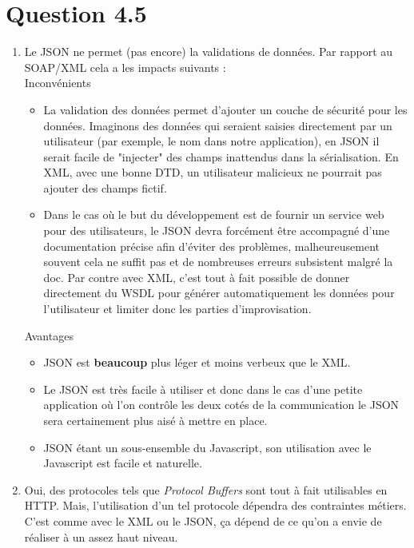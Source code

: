 \documentclass[12pt]{article}
\begin{document}
\section*{Question 4.5}

\begin{enumerate}[leftmargin=*, label=\alph*)]
\item Le JSON ne permet (pas encore) la validations de données. Par rapport au SOAP/XML cela a les impacts suivants : \\

\textcolor{pred}{Inconvénients}

\begin{itemize}
\item La validation des données permet d'ajouter un couche de sécurité pour les données. Imaginons des données qui seraient saisies directement par un utilisateur (par exemple, le nom dans notre application), en JSON il serait facile de "injecter" des champs inattendus dans la sérialisation. En XML, avec une bonne DTD, un utilisateur malicieux ne pourrait pas ajouter des champs fictif.

\item Dans le cas où le but du développement est de fournir un service web pour des utilisateurs, le JSON devra forcément être accompagné d'une documentation précise afin d'éviter des problèmes, malheureusement souvent cela ne suffit pas et de nombreuses erreurs subsistent malgré la doc. Par contre avec XML, c'est tout à fait possible de donner directement du WSDL pour générer automatiquement les données pour l'utilisateur et limiter donc les parties d'improvisation. \\
\end{itemize}

\textcolor{pgreen}{Avantages}

\begin{itemize}
\item JSON est \textbf{beaucoup} plus léger et moins verbeux que le XML.
\item Le JSON est très facile à utiliser et donc dans le cas d'une petite application où l'on contrôle les deux cotés de la communication le JSON sera certainement plus aisé à mettre en place.
\item JSON étant un sous-ensemble du Javascript, son utilisation avec le Javascript est facile et naturelle. \\
\end{itemize}

\item Oui, des protocoles tels que \emph{Protocol Buffers} sont tout à fait utilisables en HTTP. Mais, l'utilisation d'un tel protocole dépendra des contraintes métiers. C'est comme avec le XML ou le JSON, ça dépend de ce qu'on a envie de réaliser à un assez haut niveau.


\end{enumerate}
\end{document}
